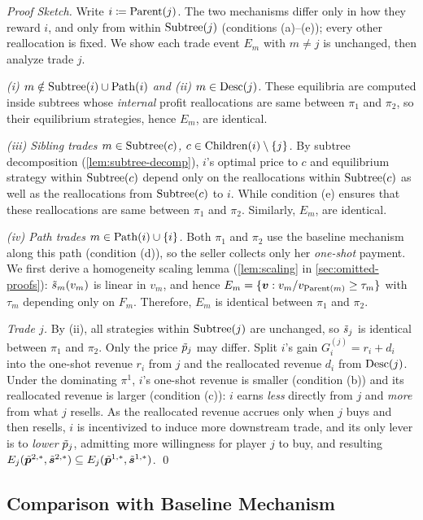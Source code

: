 \emph{Proof Sketch.}
Write $i \coloneqq \operatorname{Parent}(j)$. The two mechanisms differ only in how they reward $i$, and only from within $\operatorname{Subtree}(j)$ (conditions (a)--(e)); every other reallocation is fixed. We show each trade event $E_m$ with $m\neq j$ is unchanged, then analyze trade $j$.

\emph{(i) $m\notin\operatorname{Subtree}(i)\cup\operatorname{Path}(i)$ and (ii) $m\in\operatorname{Desc}(j)$.} These equilibria are computed inside subtrees whose \emph{internal} profit reallocations are same between $\pi_1$ and $\pi_2$, so their equilibrium strategies, hence $E_m$, are identical.

\emph{(iii) Sibling trades $m\in\operatorname{Subtree}(c)$, $c\in\operatorname{Children}(i)\setminus\{j\}$.} By subtree decomposition (\cref{lem:subtree-decomp}), $i$'s optimal price to $c$ and equilibrium strategy within $\operatorname{Subtree}(c)$ depend only on the reallocations within $\operatorname{Subtree}(c)$ as well as the reallocations from $\operatorname{Subtree}(c)$ to $i$. While condition (e) ensures that these reallocations are same between $\pi_1$ and $\pi_2$. Similarly, $E_m$, are identical.


\emph{(iv) Path trades $m\in\operatorname{Path}(i)\cup\{i\}$.} Both $\pi_1$ and $\pi_2$ use the baseline mechanism along this path (condition (d)), so the seller collects only her \emph{one-shot} payment. We first derive a homogeneity scaling lemma (\cref{lem:scaling} in \cref{sec:omitted-proofs}): $\tilde{s}_m(v_m)$ is linear in $v_m$, and hence $E_m = \{{\bm{v}} : v_m/v_{\operatorname{Parent}(m)} \ge \tau_m\}$ with $\tau_m$ depending only on $F_m$. Therefore, $E_m$ is identical between $\pi_1$ and $\pi_2$.

\emph{Trade $j$.} By (ii), all strategies within $\operatorname{Subtree}(j)$ are unchanged, so $\tilde{s}_j$ is identical between $\pi_1$ and $\pi_2$. Only the price $\tilde{p}_j$ may differ. Split $i$'s gain $G^{(j)}_i = r_i + d_i$ into the one-shot revenue $r_i$ from $j$ and the reallocated revenue $d_i$ from $\operatorname{Desc}(j)$. Under the dominating $\pi^1$, $i$'s one-shot revenue is smaller (condition (b)) and its reallocated revenue is larger (condition (c)): $i$ earns \emph{less} directly from $j$ and \emph{more} from what $j$ resells. As the reallocated revenue accrues only when $j$ buys and then resells, $i$ is incentivized to induce more downstream trade, and its only lever is to \emph{lower} $\tilde{p}_j$, admitting more willingness for player $j$ to buy, and resulting $E_j(\tilde{{\bm{p}}}^{2,*}, \tilde{{\bm{s}}}^{2,*}) \subseteq E_j(\tilde{{\bm{p}}}^{1,*}, \tilde{{\bm{s}}}^{1,*})$.
\qed

\subsection{Comparison with Baseline Mechanism}
\label{subsec:global}

